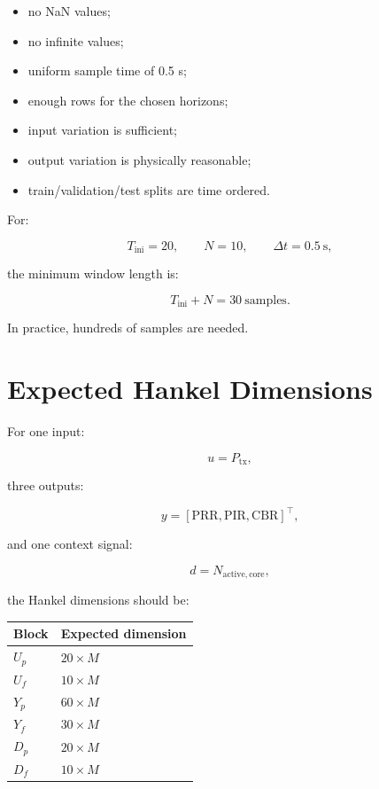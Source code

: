 \documentclass[11pt]{article}
\begin{document}
\begin{itemize}
    \item no NaN values;
    \item no infinite values;
    \item uniform sample time of 0.5 s;
    \item enough rows for the chosen horizons;
    \item input variation is sufficient;
    \item output variation is physically reasonable;
    \item train/validation/test splits are time ordered.
\end{itemize}

For:

\[
T_{\mathrm{ini}} = 20,\qquad N=10,\qquad \Delta t=0.5~\mathrm{s},
\]

the minimum window length is:

\[
T_{\mathrm{ini}} + N = 30~\mathrm{samples}.
\]

In practice, hundreds of samples are needed.

\section{Expected Hankel Dimensions}

For one input:

\[
u = P_{\mathrm{tx}},
\]

three outputs:

\[
y = [\mathrm{PRR},\mathrm{PIR},\mathrm{CBR}]^\top,
\]

and one context signal:

\[
d = N_{\mathrm{active,core}},
\]

the Hankel dimensions should be:

\begin{table}[h]
\centering
\begin{tabular}{ll}
\toprule
Block & Expected dimension \\
\midrule
$U_p$ & $20 \times M$ \\
$U_f$ & $10 \times M$ \\
$Y_p$ & $60 \times M$ \\
$Y_f$ & $30 \times M$ \\
$D_p$ & $20 \times M$ \\
$D_f$ & $10 \times M$ \\
\bottomrule
\end{tabular}
\end{table}
\end{document}
